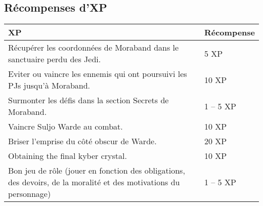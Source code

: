 \documentclass[twoside]{article}
\begin{document}
\subsection{Récompenses d'XP}
\begin{tabular}{|p{12cm}|p{4cm}|}
	\hline 
	\cellcolor{DarkRed} {\large \textcolor{PureWhite}{\textbf{XP}}} & \cellcolor{DarkRed} {\large \textcolor{PureWhite}{\textbf{Récompense}}} \\ 
	\hline 
	Récupérer les coordonnées de Moraband dans le sanctuaire perdu des Jedi. & 5 XP \\ 
	\hline 
	Eviter ou vaincre les ennemis qui ont poursuivi les PJs jusqu'à Moraband. & 10 XP \\ 
	\hline 
	Surmonter les défis dans la section Secrets de Moraband. & 1 -- 5 XP \\
	\hline 
	Vaincre Suljo Warde au combat. & 10 XP \\
	\hline 
	Briser l'emprise du côté obscur de Warde. & 20 XP \\
	\hline 
	Obtaining the final kyber crystal. & 10 XP \\
	\hline 
	Bon jeu de rôle (jouer en fonction des obligations, des devoirs, de la moralité et des motivations du personnage) & 1 -- 5 XP \\
	\hline 
\end{tabular}
\end{document}
